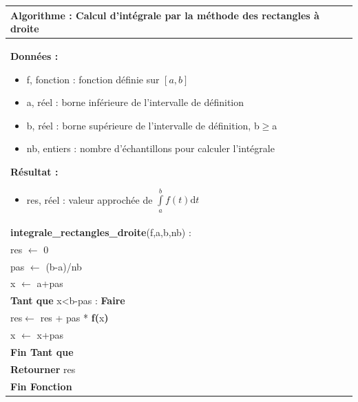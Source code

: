 \documentclass[10pt]{article}
\begin{document}
\begin{pseudo}
\begin{center}
\begin{tabular}{p{}}
\hline
\textbf{Algorithme :} Calcul d'intégrale par la méthode des rectangles à droite\\
\hline
\textbf{Données :}
\begin{itemize}
\item \textsf{f}, fonction : fonction définie sur $[a,b]$  
\item \textsf{a}, réel : borne inférieure de l'intervalle de définition
\item \textsf{b}, réel : borne supérieure de l'intervalle de définition, \textsf{b$\geq$a}
\item \textsf{nb}, entiers : nombre d'échantillons pour calculer l'intégrale
\end{itemize}
\textbf{Résultat :} 
\begin{itemize}
\item \textsf{res}, réel : valeur approchée de $\int\limits_a^b f(t)\text{d}t$
\end{itemize}
\\
\textbf{integrale\_rectangles\_droite}(\textsf{f,a,b,nb}) :\\
\hspace{.4cm}\textsf{res} $\leftarrow$ \textsf{0}\\
\hspace{.4cm}\textsf{pas} $\leftarrow$ \textsf{(b-a)/nb}\\
\hspace{.4cm}\textsf{x} $\leftarrow$ \textsf{a+pas}\\
\hspace{.4cm}\textbf{Tant que} \textsf{x<b-pas} : \textbf{Faire}\\
\hspace{.8cm}\textsf{res}$\leftarrow$ \textsf{res + pas *} \textbf{f(}\textsf{x}\textbf{)}\\
\hspace{.8cm}\textsf{x} $\leftarrow$ \textsf{x+pas}\\
\hspace{.4cm}\textbf{Fin Tant que} \\
\hspace{.4cm}\textbf{Retourner} \textsf{res}\\
\textbf{Fin Fonction} \\
\hline
\end{tabular}
\end{center}
\end{pseudo}
\end{document}
